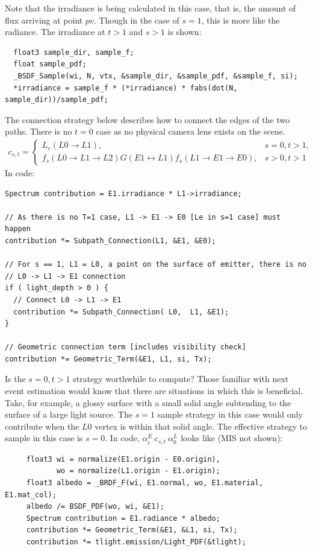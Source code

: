 \message{ !name(test.tex)}\documentclass{article}
\begin{document}
  Note that the irradiance is being calculated in this case, that is, the amount
  of flux arriving at point $pv$. Though in the case of $s=1$, this is more like
  the radiance. The irradiance at $t > 1$ and $s > 1$ is shown:

\begin{lstlisting}
  float3 sample_dir, sample_f;
  float sample_pdf;
  _BSDF_Sample(wi, N, vtx, &sample_dir, &sample_pdf, &sample_f, si);
  *irradiance = sample_f * (*irradiance) * fabs(dot(N, sample_dir))/sample_pdf;
\end{lstlisting}
  



  The connection strategy below describes how to connect the edges of the two
paths. There is no $t = 0$ case as no physical camera lens exists on the scene.
  \begin{align}
    c_{s, t} =
    \begin{cases}
      L_e(L0 \rightarrow L1), &s = 0, t > 1,\\
      f_s(L0 \rightarrow L1 \rightarrow L2) G(E1 \leftrightarrow
      L1) f_s(L1 \rightarrow E1 \rightarrow E0), &s > 0, t > 1
    \end{cases}
  \end{align}
  In code:
  \begin{lstlisting}
Spectrum contribution = E1.irradiance * L1->irradiance;

// As there is no T=1 case, L1 -> E1 -> E0 [Le in s=1 case] must happen
contribution *= Subpath_Connection(L1, &E1, &E0);

// For s == 1, L1 = L0, a point on the surface of emitter, there is no
// L0 -> L1 -> E1 connection
if ( light_depth > 0 ) {
  // Connect L0 -> L1 -> E1
  contribution *= Subpath_Connection( L0,  L1, &E1);
}

// Geometric connection term [includes visibility check]
contribution *= Geometric_Term(&E1, L1, si, Tx);

  \end{lstlisting}


  
    Is the $s = 0, t > 1$ strategy worthwhile to compute? Those familiar with
next event estimation would know that there are situations in which this is
beneficial. Take, for example, a glossy surface with a small solid angle
subtending to the surface of a large light source. The $s=1$ sample strategy in
this case would only contribute when the $L0$ vertex is within that solid angle.
The effective strategy to sample in this case is $s = 0$. In code,
$\alpha_i^E\:c_{s,t}\:\alpha_0^L$ looks like (MIS not shown):
    \begin{lstlisting}
     float3 wi = normalize(E1.origin - E0.origin),
            wo = normalize(L1.origin - E1.origin);
     float3 albedo = _BRDF_F(wi, E1.normal, wo, E1.material, E1.mat_col);
     albedo /= BSDF_PDF(wo, wi, &E1);
     Spectrum contribution = E1.radiance * albedo;
     contribution *= Geometric_Term(&E1, &L1, si, Tx);
     contribution *= tlight.emission/Light_PDF(&tlight);
    \end{lstlisting}
    
\end{document}
